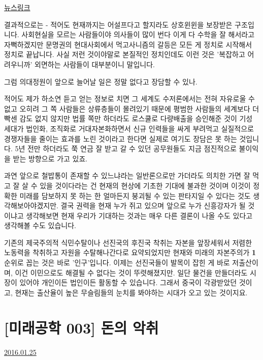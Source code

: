 \href{http://www.donga.com/docs/magazine/weekly_donga/news249/wd249ee020.html}{뉴스링크}
\vspace{5mm}

결과적으로는 - 적어도 현재까지는 어설프다고 할지라도 상호윈윈을 보장받은 구조입니다.
사회현실을 모르는 사람들이야 의사들이 많이 번다 이게 다 수학을 잘 해서라고 자뻑하겠지만
문명권의 현대사회에서 먹고사니즘의 갈등은 모든 게 정치로 시작해서 정치로 끝납니다.
사실 저런 것이야말로 본질적인 정치인데도 이런 것은 '복잡하고 어려우니까' 외면하는 사람들이 대부분이니 말입니다.
\vspace{5mm}

그럼 의대정원이 앞으로 늘어날 일은 정말 없다고 장담할 수 있나.
\vspace{5mm}

적어도 제가 하소연 듣고 얻는 정보로 치면 그 세계도 수저론에서는 전혀 자유로울 수 없고
오히려 그 쪽 사람들은 상류층들이 몰려있기 때문에 평범한 사람들의 세계보다 더 빡센 감도 없지 않지만
법률 쪽만 하더라도 로스쿨로 다량배출을 승인해준 것이 기성 세대가 법인화, 조직화로 거대자본화하면서
신규 인력들을 싸게 부려먹고 실질적으로 경쟁자들을 줄이는 효과를 노린 것이라고 한다면 실제로 여기도 장담은 못 하는 것입니다.
5년 전만 하더라도 쭉 연금 잘 받고 갈 수 있던 공무원들도 지금 점진적으로 불이익을 받는 방향으로 가고 있죠.
\vspace{5mm}

과연 앞으로 철밥통이 존재할 수 있느냐라는 일반론으로만 가더라도
의치한 가면 잘 먹고 잘 살 수 있을 것이다라는 건 현재의 현상에 기초한 기대에 불과한 것이며
이것이 정확한 미래를 담보하지 못 하는 한 얼마든지 붕괴될 수 있는 판타지일 수 있다는 것도 생각해보아야겠지만.
결국 권력을 현재 누가 쥐고 있으며 앞으로 누가 신흥강자가 될 것이냐고 생각해보면
현재 우리가 기대하는 것과는 매우 다른 결론이 나올 수도 있다고 생각해볼 수도 있습니다.
\vspace{5mm}

기존의 제국주의적 식민수탈이나 선진국의 후진국 착취는
자본을 앞장세워서 저렴한 노동력을 착취하고 자원을 수탈해나간다로 요약되었지만
현재와 미래의 자본주의가 \textbf{1}순위로 꼽는 것은 바로 '인구'입니다.
이제는 선진국들이 발목이 잡힌 게 바로 저출산이며, 이건 이민으로도 해결될 수 없다는 것이 뚜렷해졌지만.
일단 물건을 만들더라도 시장이 있어야 개인이든 법인이든 활동할 수 있습니다.
그래서 중국이 각광받았던 것이고, 현재는 출산율이 높은 무슬림들의 눈치를 봐야하는 시대가 오고 있는 것이지요.





\section{[미래공학 003] 돈의 악취}
\href{https://www.kockoc.com/Apoc/608899}{2016.01.25}


